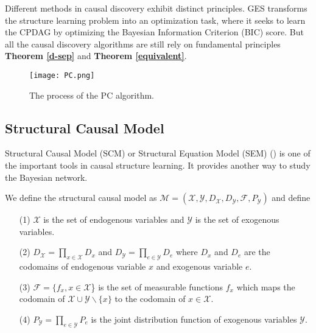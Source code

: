 \documentclass[twoside,11pt]{article}
\begin{document}
Different methods in causal discovery exhibit distinct principles. GES transforms the structure learning problem into an optimization task, where it seeks to learn the CPDAG by optimizing the Bayesian Information Criterion (BIC) score. But all the causal discovery algorithms are still rely on fundamental principles \textbf{Theorem \ref{d-sep}} and \textbf{Theorem \ref{equivalent}}.

\begin{figure*}
\centering
\texttt{[image: PC.png]}
\caption{The process of the PC algorithm.}\label{PC}
\end{figure*}




















\subsection{Structural Causal Model}
Structural Causal Model (SCM) or Structural Equation Model (SEM) (\cite{bollen1989structural}) is one of the important tools in causal structure learning. It provides another way to study the Bayesian network.
\begin{definition}
We define the structural causal model as $\mathcal M=(\mathcal X, \mathcal Y, D_\mathcal X, D_\mathcal Y, \mathcal F, P_\mathcal Y)$ and define
\begin{itemize}
\item [(1)] $\mathcal X$ is the set of endogenous variables and $\mathcal Y$ is the set of exogenous variables.\\
\item [(2)] $D_\mathcal X=\prod_{x\in\mathcal X}D_x$ and $D_\mathcal Y=\prod_{e\in\mathcal Y}D_e$ where $D_x$ and $D_e$ are the codomains of endogenous variable $x$ and exogenous variable $e$. \\
\item [(3)] $\mathcal F=\{f_x, x\in\mathcal X$\} is the set of measurable functions $f_x$ which maps the codomain of $\mathcal X\cup \mathcal Y\backslash\{x\}$ to the codomain of $x\in\mathcal X$.\\
\item [(4)] $P_\mathcal Y=\underset{e\in\mathcal Y}{\prod}P_e$ is the joint distribution function of exogenous variables $\mathcal Y$.
\end{itemize}
\end{definition}
\end{document}
